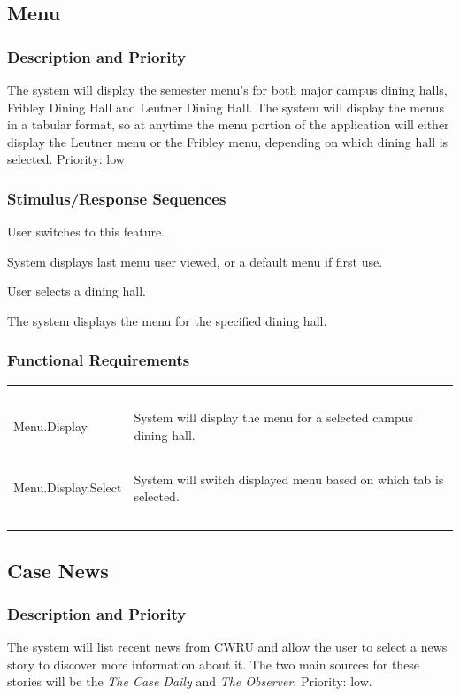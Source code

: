 \documentclass[pdftex,12pt,letter]{article}
\begin{document}
\subsection{Menu}
\subsubsection{Description and Priority}
The system will display the semester menu's for both major campus dining halls, Fribley Dining Hall and Leutner Dining Hall. The system will display the menus in a tabular format, so at anytime the menu portion of the application will either display the Leutner menu or the Fribley menu, depending on which dining hall is selected. Priority: low
\subsubsection{Stimulus/Response Sequences}
\begin{description}\itemsep1pt
\item[Stimulus:] User switches to this feature.
\item[Response:] System displays last menu user viewed, or a default menu if first use.
\item[Stimulus:] User selects a dining hall.
\item[Response:] The system displays the menu for the specified dining hall.
\end{description}
\subsubsection{Functional Requirements}
\begin{table}[!h]
\begin{tabularx}{\textwidth }[t]{|l Y|}
\hline
~&~\\
Menu.Display & System will display the menu for a selected campus dining hall.\\ 
~&~\\
Menu.Display.Select & System will switch displayed menu based on which tab is selected.\\
~&~\\
\hline
\end{tabularx}
\end{table}
\FloatBarrier
\subsection{Case News}
\subsubsection{Description and Priority}
The system will list recent news from CWRU and allow the user to select a news story to discover more information about it. The two main sources for these stories will be the \emph{The Case Daily} and \emph{The Observer}. Priority: low.
\end{document}
